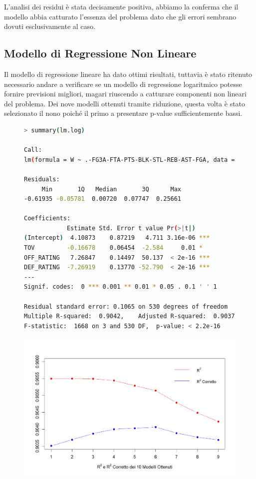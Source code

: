 \documentclass[11pt,a4paper]{article}
\begin{document}
L'analisi dei residui è stata decisamente positiva, abbiamo la conferma che il modello abbia catturato l'essenza del problema dato che gli errori sembrano dovuti esclusivamente al caso.

\subsection{Modello di Regressione Non Lineare}
Il modello di regressione lineare ha dato ottimi risultati, tuttavia è stato ritenuto necessario andare a verificare se un modello di regressione logaritmico potesse fornire previsioni migliori, magari riuscendo a catturare componenti non lineari del problema. 
Dei nove modelli ottenuti tramite riduzione, questa volta è stato selezionato il nono poiché il primo a presentare p-value sufficientemente bassi.

\begin{figure}[h]
	\hspace{-2.30cm}
    \begin{minipage}{.6\textwidth} 
	\begin{lstlisting}[language=bash,basicstyle=\tiny,tabsize=2,frame = single]
> summary(lm.log)
        
Call:
lm(formula = W ~ .-FG3A-FTA-PTS-BLK-STL-REB-AST-FGA, data = ldata)
        
Residuals:
     Min       1Q   Median       3Q      Max 
-0.61935 -0.05781  0.00720  0.07747  0.25661 
        
Coefficients:
            Estimate Std. Error t value Pr(>|t|)    
(Intercept)  4.10873    0.87219   4.711 3.16e-06 ***
TOV         -0.16678    0.06454  -2.584     0.01 *  
OFF_RATING   7.26847    0.14497  50.137  < 2e-16 ***
DEF_RATING  -7.26919    0.13770 -52.790  < 2e-16 ***
---
Signif. codes:  0 *** 0.001 ** 0.01 * 0.05 . 0.1 ' ' 1
        
Residual standard error: 0.1065 on 530 degrees of freedom
Multiple R-squared:  0.9042,	Adjusted R-squared:  0.9037 
F-statistic:  1668 on 3 and 530 DF,  p-value: < 2.2e-16
	    \end{lstlisting}
    \end{minipage}
	\begin{minipage}{0.5\textwidth} 
		\includegraphics[scale=.53]{imgs/r2_log_model.png}
	\end{minipage}
\end{figure}
\end{document}
